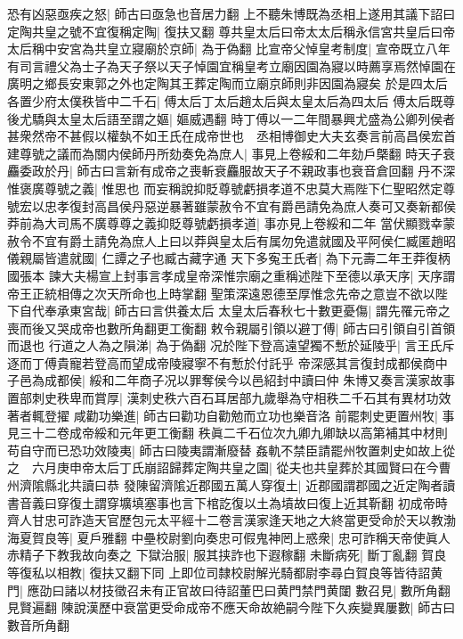 恐有凶惡亟疾之怒|{
	師古曰亟急也音居力翻}
上不聽朱博既為丞相上遂用其議下詔曰定陶共皇之號不宜復稱定陶|{
	復扶又翻}
尊共皇太后曰帝太太后稱永信宮共皇后曰帝太后稱中安宮為共皇立寢廟於京師|{
	為于偽翻}
比宣帝父悼皇考制度|{
	宣帝既立八年有司言禮父為士子為天子祭以天子悼園宜稱皇考立廟因園為寢以時薦享焉然悼園在廣明之鄉長安東郭之外也定陶其王葬定陶而立廟京師則非因園為寢矣}
於是四太后各置少府太僕秩皆中二千石|{
	傅太后丁太后趙太后與太皇太后為四太后}
傅太后既尊後尤驕與太皇太后語至謂之嫗|{
	嫗威遇翻}
時丁傅以一二年間暴興尤盛為公卿列侯者甚衆然帝不甚假以權埶不如王氏在成帝世也　丞相博御史大夫玄奏言前高昌侯宏首建尊號之議而為關内侯師丹所劾奏免為庶人|{
	事見上卷綏和二年劾戶槩翻}
時天子衰麤委政於丹|{
	師古曰言新有成帝之喪斬衰麤服故天子不親政事也衰音倉回翻}
丹不深惟褒廣尊號之義|{
	惟思也}
而妄稱說抑貶尊號虧損孝道不忠莫大焉陛下仁聖昭然定尊號宏以忠孝復封高昌侯丹惡逆暴著雖蒙赦令不宜有爵邑請免為庶人奏可又奏新都侯莽前為大司馬不廣尊尊之義抑貶尊號虧損孝道|{
	事亦見上卷綏和二年}
當伏顯戮幸蒙赦令不宜有爵土請免為庶人上曰以莽與皇太后有属勿免遣就國及平阿侯仁臧匿趙昭儀親屬皆遣就國|{
	仁譚之子也臧古藏字通}
天下多寃王氏者|{
	為下元壽二年王莽復柄國張本}
諫大夫楊宣上封事言孝成皇帝深惟宗廟之重稱述陛下至德以承天序|{
	天序謂帝王正統相傳之次天所命也上時掌翻}
聖策深遠恩德至厚惟念先帝之意豈不欲以陛下自代奉承東宮哉|{
	師古曰言供養太后}
太皇太后春秋七十數更憂傷|{
	謂先罹元帝之喪而後又哭成帝也數所角翻更工衡翻}
敕令親屬引領以避丁傅|{
	師古曰引領自引首領而退也}
行道之人為之隕涕|{
	為于偽翻}
况於陛下登高遠望獨不慙於延陵乎|{
	言王氏斥逐而丁傅貴寵若登高而望成帝陵寢寧不有慙於付託乎}
帝深感其言復封成都侯商中子邑為成都侯|{
	綏和二年商子况以罪奪侯今以邑紹封中讀曰仲}
朱博又奏言漢家故事置部刺史秩卑而賞厚|{
	漢刺史秩六百石耳居部九歲舉為守相秩二千石其有異材功效著者輒登擢}
咸勸功樂進|{
	師古曰勸功自勸勉而立功也樂音洛}
前罷刺史更置州牧|{
	事見三十二卷成帝綏和元年更工衡翻}
秩眞二千石位次九卿九卿缺以高第補其中材則苟自守而已恐功效陵夷|{
	師古曰陵夷謂漸廢替}
姦軌不禁臣請罷州牧置刺史如故上從之　六月庚申帝太后丁氏崩詔歸葬定陶共皇之園|{
	從夫也共皇葬於其國賢曰在今曹州濟隂縣北共讀曰恭}
發陳留濟隂近郡國五萬人穿復土|{
	近郡國謂郡國之近定陶者讀書音義曰穿復土謂穿壙填塞事也言下棺訖復以土為墳故曰復上近其靳翻}
初成帝時齊人甘忠可詐造天官歷包元太平經十二卷言漢家逢天地之大終當更受命於天以教渤海夏賀良等|{
	夏戶雅翻}
中壘校尉劉向奏忠可假鬼神罔上惑衆|{
	忠可詐稱天帝使眞人赤精子下教我故向奏之}
下獄治服|{
	服其挟詐也下遐稼翻}
未斷病死|{
	斷丁亂翻}
賀良等復私以相教|{
	復扶又翻下同}
上即位司隸校尉解光騎都尉李尋白賀良等皆待詔黄門|{
	應劭曰諸以材技徵召未有正官故曰待詔董巴曰黄門禁門黄闥}
數召見|{
	數所角翻見賢遍翻}
陳說漢歷中衰當更受命成帝不應天命故絶嗣今陛下久疾變異屢數|{
	師古曰數音所角翻}

